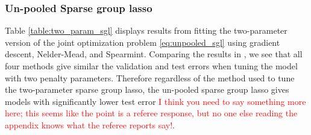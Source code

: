 \documentclass[12pt,letterpaper]{article}
\begin{document}
\subsubsection{Un-pooled Sparse group lasso}
Table \ref{table:two_param_sgl} displays results from fitting the two-parameter version of the joint optimization problem \eqref{eq:unpooled_sgl} using gradient descent, Nelder-Mead, and Spearmint. Comparing the results in \label{table:unpooled}, we see that all four methods give similar the validation and test errors when tuning the model with two penalty parameters. Therefore regardless of the method used to tune the two-parameter sparse group lasso, the un-pooled sparse group lasso gives models with significantly lower test error \textcolor{red}{I think you need to say something more here; this seems like the point is a referee response, but no one else reading the appendix knows what the referee reports say!}.
\end{document}
